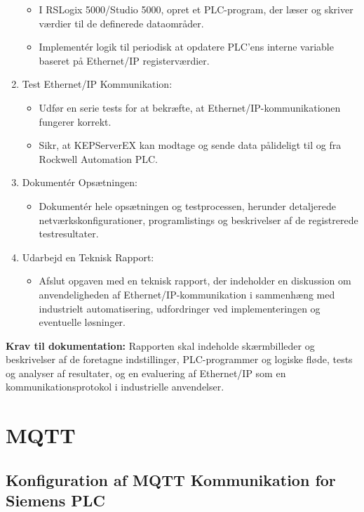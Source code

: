 \begin{enumerate}
\begin{itemize}
		\item I RSLogix 5000/Studio 5000, opret et PLC-program, der læser og skriver værdier til de definerede dataområder.
		\item Implementér logik til periodisk at opdatere PLC'ens interne variable baseret på Ethernet/IP registerværdier.
	\end{itemize}
	\item Test Ethernet/IP Kommunikation:
	\begin{itemize}
		\item Udfør en serie tests for at bekræfte, at Ethernet/IP-kommunikationen fungerer korrekt.
		\item Sikr, at KEPServerEX kan modtage og sende data pålideligt til og fra Rockwell Automation PLC.
	\end{itemize}
	\item Dokumentér Opsætningen:
	\begin{itemize}
		\item Dokumentér hele opsætningen og testprocessen, herunder detaljerede netværkskonfigurationer, programlistings og beskrivelser af de registrerede testresultater.
	\end{itemize}
	\item Udarbejd en Teknisk Rapport:
	\begin{itemize}
		\item Afslut opgaven med en teknisk rapport, der indeholder en diskussion om anvendeligheden af Ethernet/IP-kommunikation i sammenhæng med industrielt automatisering, udfordringer ved implementeringen og eventuelle løsninger.
	\end{itemize}
\end{enumerate}
\textbf{Krav til dokumentation:} Rapporten skal indeholde skærmbilleder og beskrivelser af de foretagne indstillinger, PLC-programmer og logiske fløde, tests og analyser af resultater, og en evaluering af Ethernet/IP som en kommunikationsprotokol i industrielle anvendelser.

\section{MQTT}
\subsection*{Konfiguration af MQTT Kommunikation for Siemens PLC}
\label{subsec:mqtt_comm_siemens}

